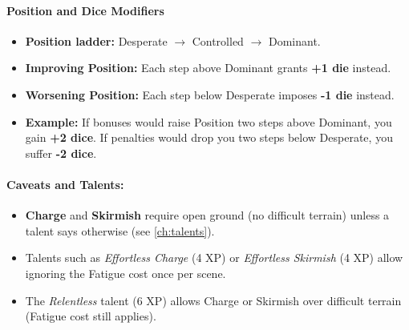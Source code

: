 \paragraph{Position and Dice Modifiers}
\label{sec:position-dice}
\begin{itemize}
  \item \textbf{Position ladder:} Desperate $\rightarrow$ Controlled $\rightarrow$ Dominant.
  \item \textbf{Improving Position:} Each step above Dominant grants \textbf{+1 die} instead.
  \item \textbf{Worsening Position:} Each step below Desperate imposes \textbf{-1 die} instead.
  \item \textbf{Example:} If bonuses would raise Position two steps above Dominant, you gain \textbf{+2 dice}. If penalties would drop you two steps below Desperate, you suffer \textbf{-2 dice}.
\end{itemize}

\paragraph{Caveats and Talents:}
\begin{itemize}
  \item \textbf{Charge} and \textbf{Skirmish} require open ground (no difficult terrain) unless a talent says otherwise (see \ref{ch:talents}).
  \item Talents such as \textit{Effortless Charge} (4 XP) or \textit{Effortless Skirmish} (4 XP) allow ignoring the Fatigue cost once per scene.
  \item The \textit{Relentless} talent (6 XP) allows Charge or Skirmish over difficult terrain (Fatigue cost still applies).
\end{itemize}

